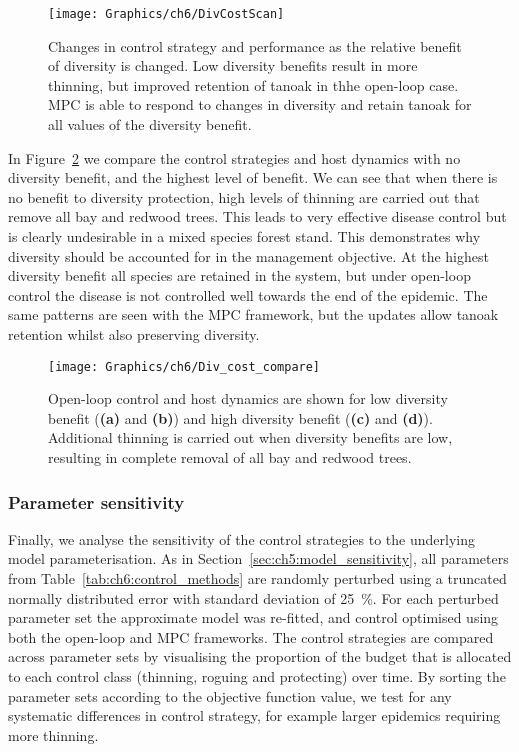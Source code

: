 \begin{figure}
    \begin{center}
        \texttt{[image: Graphics/ch6/DivCostScan]}
        \caption[Varying the diversity benefits]{Changes in control strategy and performance as the relative benefit of diversity is changed. Low diversity benefits result in more thinning, but improved retention of tanoak in thhe open-loop case. MPC is able to respond to changes in diversity and retain tanoak for all values of the diversity benefit.\label{fig:ch6:div_scan}}
    \end{center}
\end{figure}

In Figure~\ref{fig:ch6:div_compare} we compare the control strategies and host dynamics with no diversity benefit, and the highest level of benefit. We can see that when there is no benefit to diversity protection, high levels of thinning are carried out that remove all bay and redwood trees. This leads to very effective disease control but is clearly undesirable in a mixed species forest stand. This demonstrates why diversity should be accounted for in the management objective. At the highest diversity benefit all species are retained in the system, but under open-loop control the disease is not controlled well towards the end of the epidemic. The same patterns are seen with the MPC framework, but the updates allow tanoak retention whilst also preserving diversity.

\begin{figure}[t]
    \begin{center}
        \texttt{[image: Graphics/ch6/Div\_cost\_compare]}
        \caption[Host dynamics when varying the diversity benefits]{Open-loop control and host dynamics are shown for low diversity benefit (\textbf{(a)} and \textbf{(b)}) and high diversity benefit (\textbf{(c)} and \textbf{(d)}). Additional thinning is carried out when diversity benefits are low, resulting in complete removal of all bay and redwood trees.\label{fig:ch6:div_compare}}
    \end{center}
\end{figure}

\subsubsection{Parameter sensitivity}

Finally, we analyse the sensitivity of the control strategies to the underlying model parameterisation. As in Section~\ref{sec:ch5:model_sensitivity}, all parameters from Table~\ref{tab:ch6:control_methods} are randomly perturbed using a truncated normally distributed error with standard deviation of \SI{25}{\percent}. For each perturbed parameter set the approximate model was re-fitted, and control optimised using both the open-loop and MPC frameworks. The control strategies are compared across parameter sets by visualising the proportion of the budget that is allocated to each control class (thinning, roguing and protecting) over time. By sorting the parameter sets according to the objective function value, we test for any systematic differences in control strategy, for example larger epidemics requiring more thinning.

